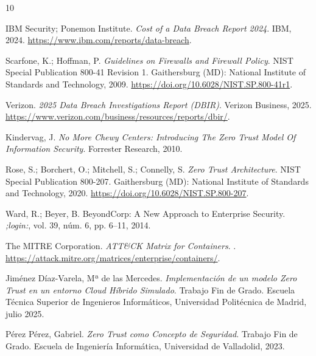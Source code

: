 \documentclass[11pt,spanish,listoffigures,listoftables]{tfgetsinf}
\begin{document}
\begin{thebibliography}{10}


   IBM Security; Ponemon Institute.
   \newblock \textit{Cost of a Data Breach Report 2024}.
   \newblock IBM, 2024.
   \newblock \url{https://www.ibm.com/reports/data-breach}.

   Scarfone, K.; Hoffman, P.
   \newblock \textit{Guidelines on Firewalls and Firewall Policy}.
   \newblock NIST Special Publication 800-41 Revision 1. Gaithersburg (MD):
   National Institute of Standards and Technology, 2009.
   \newblock \url{https://doi.org/10.6028/NIST.SP.800-41r1}.

   Verizon.
   \newblock \textit{2025 Data Breach Investigations Report (DBIR)}.
   \newblock Verizon Business, 2025.
   \newblock \url{https://www.verizon.com/business/resources/reports/dbir/}.

   Kindervag, J.
   \newblock \textit{No More Chewy Centers: Introducing The Zero Trust Model
   Of Information Security}.
   \newblock Forrester Research, 2010.

   Rose, S.; Borchert, O.; Mitchell, S.; Connelly, S.
   \newblock \textit{Zero Trust Architecture}.
   \newblock NIST Special Publication 800-207. Gaithersburg (MD): National
   Institute of Standards and Technology, 2020.
   \newblock \url{https://doi.org/10.6028/NIST.SP.800-207}.

   Ward, R.; Beyer, B.
   \newblock BeyondCorp: A New Approach to Enterprise Security.
   \newblock \textit{;login:}, vol. 39, núm. 6, pp. 6--11, 2014.

   The MITRE Corporation.
   \newblock \textit{ATT\&CK Matrix for Containers}.
   .
   \newblock \url{https://attack.mitre.org/matrices/enterprise/containers/}.

   Jiménez Díaz-Varela, Mª de las Mercedes.
   \newblock \textit{Implementación de un modelo Zero Trust en un entorno Cloud
   Híbrido Simulado}.
   \newblock Trabajo Fin de Grado. Escuela Técnica Superior de Ingenieros
   Informáticos, Universidad Politécnica de Madrid, julio 2025.

   Pérez Pérez, Gabriel.
   \newblock \textit{Zero Trust como Concepto de Seguridad}.
   \newblock Trabajo Fin de Grado. Escuela de Ingeniería Informática,
   Universidad de Valladolid, 2023.


\end{thebibliography}
\end{document}
